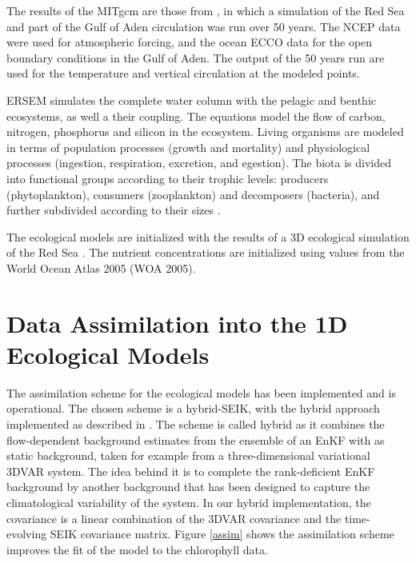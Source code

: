 The results of the MITgcm are those from \citet{Yao2014, Yao2014b}, in which a
simulation of the Red Sea and part of the Gulf of Aden circulation was run over
50 years. The NCEP data were used for atmospheric forcing, and the ocean ECCO
data for the open boundary conditions in the Gulf of Aden. The output of the 50
years run are used for the temperature and vertical circulation at the modeled
points.

ERSEM simulates the complete water column with the pelagic and benthic
ecosystems, as well a their coupling. The equations model the flow of carbon,
nitrogen, phosphorus and silicon in the ecosystem. Living organisms are modeled
in terms of population processes (growth and mortality) and physiological
processes (ingestion, respiration, excretion, and egestion). The biota is
divided into functional groups according to their trophic levels: producers
(phytoplankton), consumers (zooplankton) and decomposers (bacteria), and
further subdivided according to their sizes \citep{Baretta1995}.

The ecological models are initialized with the results of a 3D ecological
simulation of the Red Sea \citep{Triantafyllou2014}. The nutrient
concentrations are initialized using values from the World Ocean Atlas 2005
(WOA 2005).

\section{Data Assimilation into the 1D Ecological Models}

The assimilation scheme for the ecological models has been implemented and is
operational. The chosen scheme is a hybrid-SEIK, with the hybrid approach
implemented as described in \citet{Hamill2000}.  The scheme is called hybrid as
it combines the flow-dependent background estimates from the ensemble of an
EnKF with as static background, taken for example from a three-dimensional
variational 3DVAR system. The idea behind it is to complete the rank-deficient
EnKF background by another background that has been designed to capture the
climatological variability of the system.  In our hybrid implementation, the
covariance is a linear combination of the 3DVAR covariance and the
time-evolving SEIK covariance matrix. Figure \ref{assim} shows the assimilation
scheme improves the fit of the model to the chlorophyll data.

